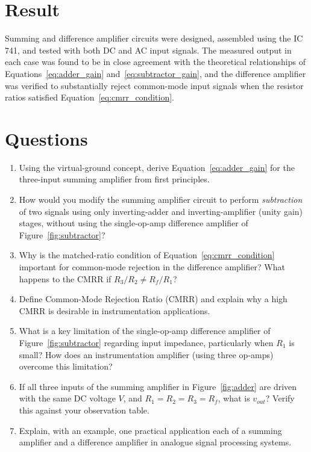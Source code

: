 \section{Result}

Summing and difference amplifier circuits were designed, assembled using the IC 741, and tested with both DC and AC input signals. The measured output in each case was found to be in close agreement with the theoretical relationships of Equations~\eqref{eq:adder_gain} and~\eqref{eq:subtractor_gain}, and the difference amplifier was verified to substantially reject common-mode input signals when the resistor ratios satisfied Equation~\eqref{eq:cmrr_condition}.

\section{Questions}
\begin{enumerate}[label=Q\arabic*.]
	\item Using the virtual-ground concept, derive Equation~\eqref{eq:adder_gain} for the three-input summing amplifier from first principles.
	\item How would you modify the summing amplifier circuit to perform \emph{subtraction} of two signals using only inverting-adder and inverting-amplifier (unity gain) stages, without using the single-op-amp difference amplifier of Figure~\ref{fig:subtractor}?
	\item Why is the matched-ratio condition of Equation~\eqref{eq:cmrr_condition} important for common-mode rejection in the difference amplifier? What happens to the CMRR if $R_3/R_2 \neq R_f/R_1$?
	\item Define Common-Mode Rejection Ratio (CMRR) and explain why a high CMRR is desirable in instrumentation applications.
	\item What is a key limitation of the single-op-amp difference amplifier of Figure~\ref{fig:subtractor} regarding input impedance, particularly when $R_1$ is small? How does an instrumentation amplifier (using three op-amps) overcome this limitation?
	\item If all three inputs of the summing amplifier in Figure~\ref{fig:adder} are driven with the same DC voltage $V$, and $R_1=R_2=R_3=R_f$, what is $v_{out}$? Verify this against your observation table.
	\item Explain, with an example, one practical application each of a summing amplifier and a difference amplifier in analogue signal processing systems.
\end{enumerate}